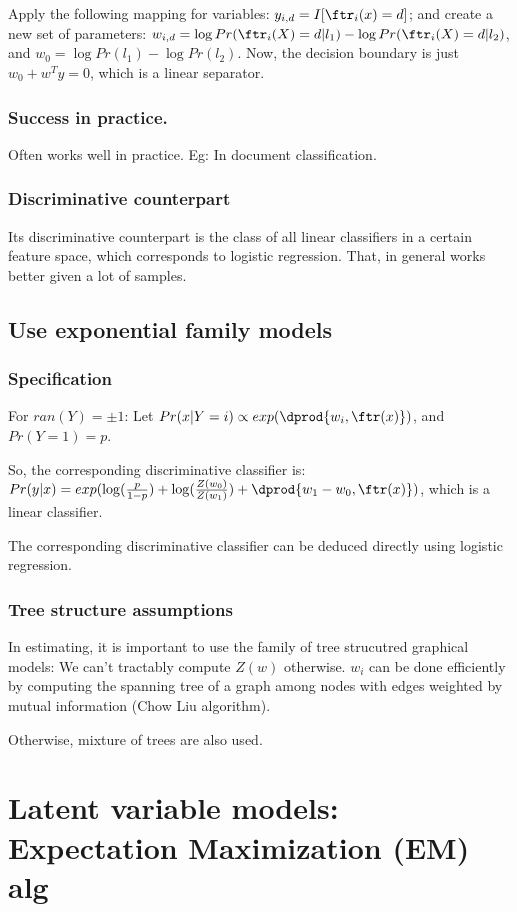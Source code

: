 \documentclass[oneside, article]{memoir}
\begin{document}
Apply the following mapping for variables: $y_{i,d} = I[\ftr_i(x) = d]$; and create a new set of parameters: $w_{i, d} = \log Pr(\ftr_{i}(X) = d|l_1) - \log Pr(\ftr_{i}(X) = d|l_2)$, and $w_0 = \log Pr(l_1) - \log Pr(l_2)$. Now, the decision boundary is just $w_0 + w^{T}y = 0$, which is a linear separator.

\subsubsection{Success in practice.}
Often works well in practice. Eg: In document classification.

\subsubsection{Discriminative counterpart}
Its discriminative counterpart is the class of all linear classifiers in a certain feature space, which corresponds to logistic regression. That, in general works better given a lot of samples.

\subsection{Use exponential family models}
\subsubsection{Specification}
For $ran(Y) = \pm1$: Let $Pr(x|Y=i) \propto exp(\dprod{w_i, \ftr(x)})$, and $Pr(Y=1) = p$.

So, the corresponding discriminative classifier is: $Pr(y|x) = exp(\log(\frac{p}{1-p}) + \log(\frac{Z(w_0)}{Z(w_1)}) + \dprod{w_1 - w_0, \ftr(x)})$, which is a linear classifier.

The corresponding discriminative classifier can be deduced directly using logistic regression.

\subsubsection{Tree structure assumptions}
In estimating, it is important to use the family of tree strucutred graphical models: We can't tractably compute $Z(w)$ otherwise. $w_i$ can be done efficiently by computing the spanning tree of a graph among nodes with edges weighted by mutual information (Chow Liu algorithm).

Otherwise, mixture of trees are also used.

\section{Latent variable models: Expectation Maximization (EM) alg}
\end{document}
